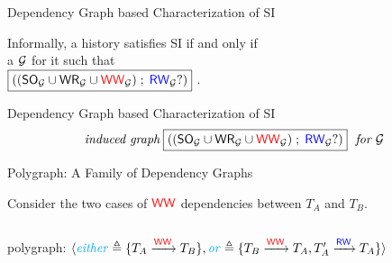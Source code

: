 \begin{frame}{Dependency Graph based Characterization of SI}
	\begin{theorem}
		Informally, a history satisfies SI if and only if \\[3pt]
		 a  $\mathcal{G}$ for it such that \\[3pt]
		 ${\boxed{((\textup{\textsf{SO}}_{\mathcal{G}} \cup \textup{\textsf{WR}}_{\mathcal{G}} \cup \textcolor{red}{\textup{\textsf{WW}}}_{\mathcal{G}}) \;;\; \textcolor{blue}{\textup{\textsf{RW}}}_{\mathcal{G}}?)}}$ .
	\end{theorem}
\end{frame}

\begin{frame}{Dependency Graph based Characterization of SI}
	\[
		\text{\it induced graph}\; {\boxed{((\textup{\textsf{SO}}_{\mathcal{G}} \cup \textup{\textsf{WR}}_{\mathcal{G}} \cup \textcolor{red}{\textup{\textsf{WW}}}_{\mathcal{G}}) \;;\; \textcolor{blue}{\textup{\textsf{RW}}}_{\mathcal{G}}?)}} \text{\it\; for $\mathcal{G}$}
	\]

	\begin{center}
		\resizebox{0.60\textwidth}{!}{}
		\vspace{0.30cm}


		\vspace{0.20cm}
	\end{center}
\end{frame}

\begin{frame}{Polygraph: A Family of Dependency Graphs}
	\begin{center}
		Consider the two cases of $\textcolor{red}{\textup{\textsf{WW}}}$ dependencies between $T_{A}$ and $T_{B}$.
	\end{center}

	\vspace{-0.20cm}
	\begin{columns}[c]
	\end{columns}

	\vspace{-0.20cm}
	\begin{center}
		\pause
		polygraph:
		$\langle\textcolor{cyan}{\mathit{either}} \triangleq \{T_{A} \xrightarrow{\textcolor{red}{\textup{\textsf{WW}}}} T_{B}\},
				\textcolor{cyan}{\mathit{or}} \triangleq \{T_{B} \xrightarrow{\textcolor{red}{\textup{\textsf{WW}}}} T_{A}, T_{A}' \xrightarrow{\textcolor{blue}{\textup{\textsf{RW}}}} T_{A}\}\rangle
		$
	\end{center}
\end{frame}

